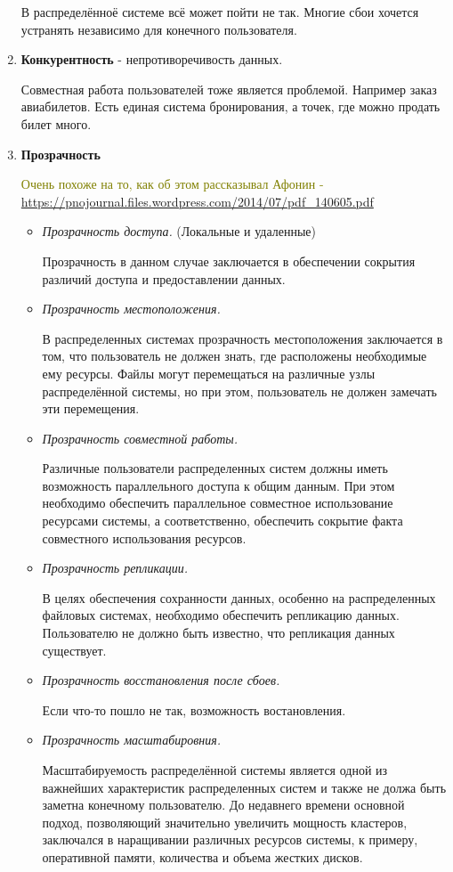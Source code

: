 \begin{enumerate}
В распределённоё системе всё может пойти не так.
Многие сбои хочется устранять независимо для конечного пользователя.

\item
\textbf{ Конкурентность} - непротиворечивость данных.

Совместная работа пользователей тоже является проблемой.
Например заказ авиабилетов. Есть единая система бронирования, а точек, где можно продать билет много.

\item
\textbf{ Прозрачность}

\textcolor{olive}{Очень похоже на то, как об этом рассказывал Афонин -}\textcolor{blue}{\url{https://pnojournal.files.wordpress.com/2014/07/pdf_140605.pdf}}
\begin{itemize}
\item
\textit{ Прозрачность доступа.} (Локальные и удаленные)

Прозрачность в данном случае заключается в обеспечении сокрытия различий доступа и предоставлении данных.

\item
\textit{ Прозрачность местоположения. }

В распределенных системах прозрачность местоположения заключается в том, что пользователь не должен знать, где расположены необходимые ему ресурсы. 
Файлы могут перемещаться на различные узлы распределённой системы, но при этом, пользователь не должен замечать эти перемещения.

\item
\textit{ Прозрачность совместной работы.}

Различные пользователи распределенных систем должны иметь возможность параллельного доступа к общим данным. При этом необходимо обеспечить параллельное совместное использование ресурсами системы, а соответственно, обеспечить сокрытие факта совместного использования ресурсов.

\item
\textit{ Прозрачность репликации. }

В целях обеспечения сохранности данных, особенно на распределенных файловых системах, необходимо обеспечить репликацию данных. Пользователю не должно быть известно, что репликация данных существует.

\item
\textit{ Прозрачность восстановления после сбоев.}

Если что-то пошло не так, возможность востановления.

\item
\textit{ Прозрачность масштабировния.}

Масштабируемость распределённой системы является одной из важнейших характеристик распределенных систем и также не должа быть заметна конечному пользователю. До недавнего времени основной подход, позволяющий значительно увеличить мощность кластеров, заключался в наращивании различных ресурсов системы, к примеру, оперативной памяти, количества и объема жестких дисков. 
\end{itemize}

\end{enumerate}
